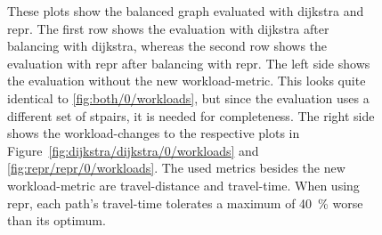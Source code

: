         \begin{figure}[hbp]
            \centering%
            \hfill%

            \hfill%
            \caption[Initial workloads and workload-changes when evaluating]{%
                These plots show the balanced graph evaluated with \gls{dijkstra} and \gls{repr}.
                The first row shows the evaluation with \gls{dijkstra} after \gls{balancing} with \gls{dijkstra}, whereas the second row shows the evaluation with \gls{repr} after \gls{balancing} with \gls{repr}.
                The left side shows the evaluation without the new workload-\gls{metric}.
                This looks quite identical to \vref{fig:both/0/workloads}, but since the evaluation uses a different set of \glspl{stpair}, it is needed for completeness.
                The right side shows the workload-changes to the respective plots in Figure~\ref{fig:dijkstra/dijkstra/0/workloads} and \vref{fig:repr/repr/0/workloads}.
                The used \glspl{metric} besides the new workload-\gls{metric} are travel-distance and travel-time.
                When using \gls{repr}, each path's travel-time tolerates a maximum of \si{\num{40} \percent} worse than its optimum.
                \label{fig:both/both/0/workloads}
                \label{fig:both/both/1/delta_workloads}
            }
        \end{figure}

